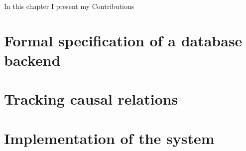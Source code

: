 
In this chapter I present my Contributions

\chapter{Formal specification of a database backend}
\label{ch:formal-spec}


\chapter{Tracking causal relations}
\label{ch:tracking-causal-relations}


\chapter{Implementation of the system}
\label{ch:implementation}


% 
